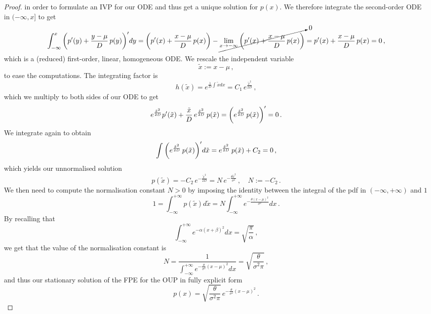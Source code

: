 \documentclass[../main.tex]{subfiles}
\begin{document}
\begin{proof}
in order to formulate an IVP for our ODE and thus get a unique solution for $p(x)$.
We therefore integrate the second-order ODE in $(-\infty,x]$ to get
\begin{equation*}
        \int_{-\infty}^{x}\bigg(p'(y)+\frac{y-\mu}{D}\,p(y)\bigg)'dy = \bigg(p'(x)+\frac{x-\mu}{D}\,p(x)\bigg)-\cancelto{0}{\lim_{x\to-\infty}\bigg(p'(x)+\frac{x-\mu}{D}\,p(x)\bigg)}=p'(x)+\frac{x-\mu}{D}\,p(x)=0\,,
\end{equation*}
which is a (reduced) first-order, linear, homogeneous ODE.
We rescale the independent variable
\begin{equation*}
        \tilde{x} := x-\mu\,,
\end{equation*}
to ease the computations.
The integrating factor is
\begin{equation*}
        h(\tilde{x}) = e^{\frac{1}{D}\int_{}^{}\tilde{x}dx} = C_{1}\,e^{\frac{\tilde{x}^{2}}{2D}}\,,
\end{equation*}
which we multiply to both sides of our ODE to get
\begin{equation*}
        e^{\frac{\tilde{x}^{2}}{2D}}p'(\tilde{x})+\frac{\tilde{x}}{D}\,e^{\frac{\tilde{x}^{2}}{2D}}\,p(\tilde{x})=\bigg(e^{\frac{\tilde{x}^{2}}{2D}}\,p(\tilde{x})\bigg)'=0\,.
\end{equation*}
We integrate again to obtain
\begin{equation*}
        \int_{}^{}\bigg(e^{\frac{\tilde{x}^{2}}{2D}}\,p(\tilde{x})\bigg)'d\tilde{x} = e^{\frac{\tilde{x}^{2}}{2D}}\,p(\tilde{x}) + C_{2} = 0\,,
\end{equation*}
which yields our unnormalised solution
\begin{equation*}
        p(\tilde{x})=-C_{2}\,e^{-\frac{\tilde{x}^{2}}{2D}}=N\,e^{-\frac{\theta\tilde{x}^{2}}{\sigma^2}}\,,\quad N:=-C_{2}\,.
\end{equation*}
We then need to compute the normalisation constant $N>0$ by imposing the identity between the integral of the pdf in $(-\infty,+\infty)$ and $1$
\begin{equation*}
        1 = \int_{-\infty}^{+\infty}p(\tilde{x})d\tilde{x} = N \int_{-\infty}^{+\infty}e^{-\frac{\theta(x-\mu)^{2}}{\sigma^{2}}}dx\,.
\end{equation*}
By recalling that
\begin{equation*}
        \int_{-\infty}^{+\infty}e^{-\alpha(x+\beta)^{2}}dx = \sqrt{\frac{\pi}{\alpha}}\,,
\end{equation*}
we get that the value of the normalisation constant is
\begin{equation*}
        N = \frac{1}{\int_{-\infty}^{+\infty}e^{-\frac{\theta}{\sigma^{2}}(x-\mu)^{2}}dx} = \sqrt{\frac{\theta}{\sigma^{2}\pi}}\,,
\end{equation*}
and thus our stationary solution of the FPE for the OUP in fully explicit form
\begin{equation*}
        p(x) = \sqrt{\frac{\theta}{\sigma^{2}\pi}}\,e^{-\frac{\theta}{\sigma^{2}}(x-\mu)^{2}}\,.
\end{equation*}
\end{proof}
\end{document}

